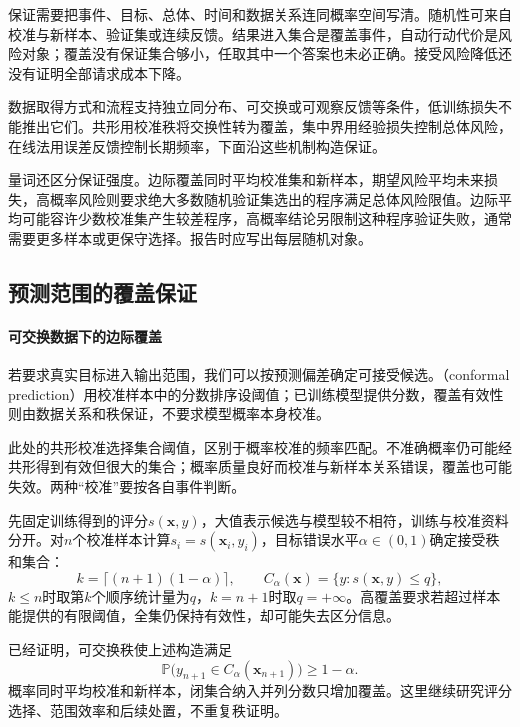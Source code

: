 保证需要把事件、目标、总体、时间和数据关系连同概率空间写清。随机性可来自校准与新样本、验证集或连续反馈。结果进入集合是覆盖事件，自动行动代价是风险对象；覆盖没有保证集合够小，任取其中一个答案也未必正确。接受风险降低还没有证明全部请求成本下降。

数据取得方式和流程支持独立同分布、可交换或可观察反馈等条件，低训练损失不能推出它们。共形用校准秩将交换性转为覆盖，集中界用经验损失控制总体风险，在线法用误差反馈控制长期频率，下面沿这些机制构造保证。

量词还区分保证强度。边际覆盖同时平均校准集和新样本，期望风险平均未来损失，高概率风险则要求绝大多数随机验证集选出的程序满足总体风险限值。边际平均可能容许少数校准集产生较差程序，高概率结论另限制这种程序验证失败，通常需要更多样本或更保守选择。报告时应写出每层随机对象。

\subsection{预测范围的覆盖保证}

\paragraph{可交换数据下的边际覆盖}

若要求真实目标进入输出范围，我们可以按预测偏差确定可接受候选。（conformal prediction）用校准样本中的分数排序设阈值；已训练模型提供分数，覆盖有效性则由数据关系和秩保证，不要求模型概率本身校准。

此处的共形校准选择集合阈值，区别于概率校准的频率匹配。不准确概率仍可能经共形得到有效但很大的集合；概率质量良好而校准与新样本关系错误，覆盖也可能失效。两种“校准”要按各自事件判断。

先固定训练得到的评分$s(\bm{x},y)$，大值表示候选与模型较不相符，训练与校准资料分开。对$n$个校准样本计算$s_i=s(\bm{x}_i,y_i)$，目标错误水平$\alpha\in(0,1)$确定接受秩和集合：
\begin{equation}
 k=\lceil(n+1)(1-\alpha)\rceil,\qquad
 C_\alpha(\bm{x})=\{y:s(\bm{x},y)\leq q\},
 \label{eq:reliability-conformal-set}
\end{equation}
$k\leq n$时取第$k$个顺序统计量为$q$，$k=n+1$时取$q=+\infty$。高覆盖要求若超过样本能提供的有限阈值，全集仍保持有效性，却可能失去区分信息。

已经证明，可交换秩使上述构造满足
\[
 \mathbb P\bigl(y_{n+1}\in C_\alpha(\bm{x}_{n+1})\bigr)
 \geq1-\alpha.
\]
概率同时平均校准和新样本，闭集合纳入并列分数只增加覆盖。这里继续研究评分选择、范围效率和后续处置，不重复秩证明。

